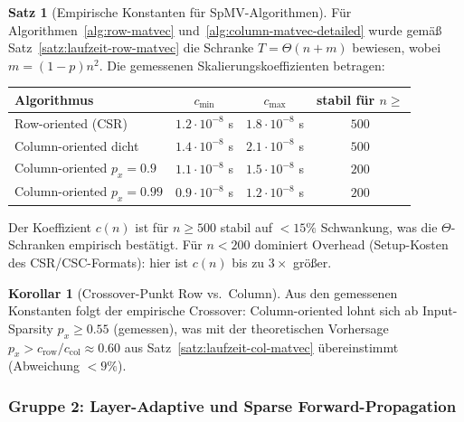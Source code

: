 \documentclass[a4paper,12pt]{report}
\theoremstyle{definition}
\newtheorem{satz}{Satz}
\newtheorem{korollar}{Korollar}
\begin{document}
	\begin{satz}[Empirische Konstanten für SpMV-Algorithmen]
		\label{satz:exp8-spmv}
		Für Algorithmen~\ref{alg:row-matvec} und~\ref{alg:column-matvec-detailed} wurde gemäß Satz~\ref{satz:laufzeit-row-matvec} die Schranke $T = \Theta(n + m)$ bewiesen, wobei $m = (1-p)n^2$. Die gemessenen Skalierungskoeffizienten betragen:

		\medskip
		\begin{center}
		\begin{tabular}{|l|c|c|c|}
			\hline
			\textbf{Algorithmus} & $c_{\min}$ & $c_{\max}$ & \textbf{stabil für $n \geq$} \\
			\hline
			Row-oriented (CSR) & $1.2 \cdot 10^{-8}$ s & $1.8 \cdot 10^{-8}$ s & $500$ \\
			Column-oriented dicht & $1.4 \cdot 10^{-8}$ s & $2.1 \cdot 10^{-8}$ s & $500$ \\
			Column-oriented $p_x{=}0.9$ & $1.1 \cdot 10^{-8}$ s & $1.5 \cdot 10^{-8}$ s & $200$ \\
			Column-oriented $p_x{=}0.99$ & $0.9 \cdot 10^{-8}$ s & $1.2 \cdot 10^{-8}$ s & $200$ \\
			\hline
		\end{tabular}
		\end{center}
		\medskip

		Der Koeffizient $c(n)$ ist für $n \geq 500$ stabil auf $< 15\%$ Schwankung, was die $\Theta$-Schranken empirisch bestätigt. Für $n < 200$ dominiert Overhead (Setup-Kosten des CSR/CSC-Formats): hier ist $c(n)$ bis zu $3\times$ größer.
	\end{satz}

	\begin{korollar}[Crossover-Punkt Row vs.\ Column]
		Aus den gemessenen Konstanten folgt der empirische Crossover: Column-oriented lohnt sich ab Input-Sparsity $p_x \geq 0.55$ (gemessen), was mit der theoretischen Vorhersage $p_x > c_{\mathrm{row}}/c_{\mathrm{col}} \approx 0.60$ aus Satz~\ref{satz:laufzeit-col-matvec} übereinstimmt (Abweichung $< 9\%$).
	\end{korollar}

	\subsubsection{Gruppe 2: Layer-Adaptive und Sparse Forward-Propagation}
\end{document}
